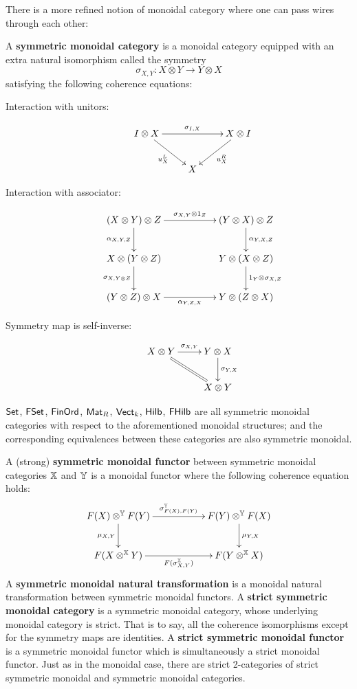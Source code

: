 There is a more refined notion of monoidal category where one can pass wires through each other:
\begin{definition}
A {\bf symmetric monoidal category} is a monoidal category equipped with an extra natural isomorphism called the symmetry
$$
\sigma_{X,Y}:X\otimes Y \to Y\otimes X
$$
satisfying the following coherence equations:
\begin{description}
\item[Interaction with unitors:]
$$
\xymatrix{
I \otimes X \ar[rr]^{\sigma_{I,X}} \ar[rd]_{u^L_X} && X \otimes I \ar[ld]^{u^R_X} \\
& X &
}
$$
\item[Interaction with associator:]
$$
\xymatrix{
  (X\otimes Y)\otimes Z \ar[rr]^{\sigma_{X,Y}\otimes 1_Z} \ar[d]_{\alpha_{X,Y,Z}}
    &
    &  (Y\otimes X)\otimes Z \ar[d]^{\alpha_{Y,X,Z}}
  \\X\otimes(Y\otimes Z) \ar[d]_{\sigma_{X,Y\otimes Z}}
    &
    &  Y\otimes(X\otimes Z) \ar[d]^{1_Y\otimes \sigma_{X,Z}}
  \\ (Y\otimes Z)\otimes X \ar[rr]_{\alpha_{Y,Z,X}}
    &
    & Y\otimes (Z\otimes X)
}
$$
\item[Symmetry map is self-inverse:]
$$
\xymatrix{
   X\otimes Y \ar[r]^{\sigma_{X,Y}} \ar@{=}[dr]
   &  Y\otimes X \ar[d]^{\sigma_{Y,X}}\\
   & X \otimes Y
}
$$
\end{description}
\end{definition}
\begin{example}
$\mathsf{Set}$, $\mathsf{FSet}$, $\mathsf{FinOrd}$, $\mathsf{Mat}_R$, $\mathsf{Vect}_k$, $\mathsf{Hilb}$, $\mathsf{FHilb}$ are all symmetric monoidal categories with respect to the aforementioned monoidal structures; and the corresponding equivalences between these categories are also symmetric monoidal.
\end{example}
\begin{definition}
A (strong) {\bf symmetric monoidal functor} between symmetric monoidal categories $\mathbb{X}$ and $\mathbb{Y}$ is a monoidal functor where the following coherence equation holds:
$$
\xymatrix{
  F(X)\otimes^\Y F(Y) \ar[rr]^{\sigma_{F(X),F(Y)}^\Y} \ar[d]_{\mu_{X,Y}}
   && F(Y) \otimes^\Y F(X) \ar[d]^{\mu_{Y,X}}
\\F(X\otimes^\X Y) \ar[rr]_{F(\sigma_{X,Y}^\X)}
 && F(Y \otimes^\X X)
}
$$
A {\bf symmetric monoidal natural transformation} is a monoidal natural transformation between symmetric monoidal functors.  
A {\bf strict symmetric monoidal category} is a symmetric monoidal category, whose underlying monoidal category is strict. That is to say, all the coherence isomorphisms except for the symmetry maps are identities.
A {\bf strict symmetric monoidal functor} is a symmetric monoidal functor which is simultaneously a strict monoidal functor.
Just as in the monoidal case, there are strict 2-categories of strict symmetric monoidal and symmetric monoidal categories.
\end{definition}
